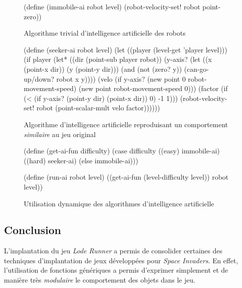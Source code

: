 \documentclass[12pt,twoside,letterpaper,francais]{book}
\begin{document}
\begin{figure}[htb!]
  \begin{schemecode}
(define (immobile-ai robot level)
  (robot-velocity-set! robot point-zero))
  \end{schemecode}
  \caption{Algorithme trivial d'intelligence artificielle des robots}
  \label{Exp:ai-imm}
\end{figure}

\medskip

\begin{figure}[htb!]
  \begin{schemecode}
(define (seeker-ai robot level)
  (let ((player (level-get 'player level)))
    (if player
        (let* ((dir (point-sub player robot))
               (y-axis? (let ((x (point-x dir)) (y (point-y dir)))
                          (and (not (zero? y))
                               (can-go-up/down? robot x y))))
               (velo (if y-axis?
                         (new point 0 robot-movement-speed)
                         (new point robot-movement-speed 0)))
               (factor (if (< (if y-axis? (point-y dir) (point-x dir)) 0)
                           -1
                           1)))
          (robot-velocity-set! robot (point-scalar-mult velo factor))))))
  \end{schemecode}
  \caption{Algorithme d'intelligence artificielle reproduisant un
    comportement \emph{similaire} au jeu original}
  \label{Exp:ai-seek}
\end{figure}

\medskip

\begin{figure}[htb!]
  \begin{schemecode}
(define (get-ai-fun difficulty)
  (case difficulty
    ((easy) immobile-ai)
    ((hard) seeker-ai)
    (else immobile-ai)))

(define (run-ai robot level)
  ((get-ai-fun (level-difficulty level)) robot level))
  \end{schemecode}
  \caption{Utilisation dynamique des algorithmes d'intelligence
    artificielle}
  \label{Exp:dyn-ai}
\end{figure}

\clearpage

\FloatBarrier
\subsection{Conclusion}
L'implantation du jeu \textit{Lode Runner} a permis de consolider certaines des
techniques d'implantation de jeux développées pour \textit{Space Invaders}. En effet,
l'utilisation de fonctions génériques a permis d'exprimer simplement
et de manière très \emph{modulaire} le comportement des objets dans le
jeu.
\end{document}
